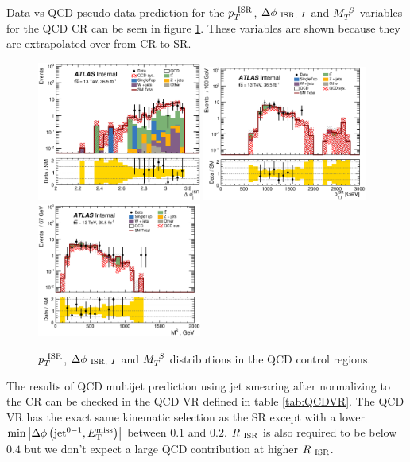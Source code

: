 \indent Data vs QCD pseudo-data prediction for the $p_{T}^{~\mathrm{ISR}}$, $\Delta\phi_{~\mathrm{ISR},~I}$ and $M_{T}^{~S}$ variables for the QCD CR can be seen in figure \ref{fig:QCD:CR}.  These variables are shown because they are extrapolated over from CR to SR. \\

\begin{figure}[!htbp]
\begin{center}
\includegraphics[width=0.48\textwidth]{figures/QCDJetSmearing/CRQC/dphiISRI_36500.eps}
\includegraphics[width=0.48\textwidth]{figures/QCDJetSmearing/CRQC/PTISR_36500}
\includegraphics[width=0.48\textwidth]{figures/QCDJetSmearing/CRQC/MV_36500}
\caption{$p_{T}^{~\mathrm{ISR}}$, $\Delta\phi_{~\mathrm{ISR},~I}$ and $M_{T}^{~S}$ distributions in the QCD control regions.}
\label{fig:QCD:CR}
\end{center}
\end{figure}

\indent The results of QCD multijet prediction using jet smearing after normalizing to the CR can be checked in the QCD VR defined in table \ref{tab:QCDVR}.   The QCD VR has the exact same kinematic selection as the SR except with a lower $\min \left|\Delta\phi\left(\mathrm{jet}^{0-1},E_{\mathrm{T}}^{\mathrm{miss}}\right)\right|$ between $0.1$ and $0.2$.  $R_{~\mathrm{ISR}}$ is also required to be below $0.4$ but we don't expect a large QCD contribution at higher $R_{~\mathrm{ISR}}$.  \\

